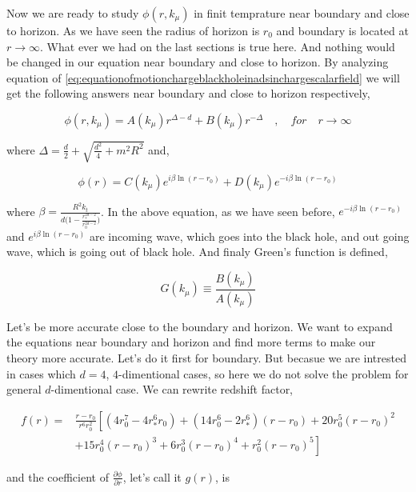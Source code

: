 Now we are ready to study $\phi(r,k_\mu)$ in finit temprature near boundary and close to horizon. As we have seen the radius of horizon is $r_0$ and boundary is located at $r \rightarrow \infty$. What ever we had on the last sections is true here. And nothing would be changed in our equation near boundary and close to horizon. By analyzing equation of \ref{eq:equationofmotionchargeblackholeinadsinchargescalarfield} we will get the following answers near boundary and close to horizon respectively,

\begin{equation}
    \phi(r,k_\mu) = A(k_\mu)r^{\Delta-d} + B(k_\mu)r^{-\Delta} \quad , \quad for \quad r \rightarrow \infty
\end{equation}

where $\Delta = \frac{d}{2} + \sqrt{\frac{d^2}{4} + m^2R^2}$ and,

\begin{equation}
    \phi(r) = C(k_\mu)e^{ i\beta \ln{(r-r_0)}} + D(k_\mu)e^{- i\beta\ln{(r-r_0)}} 
\end{equation}

where $\beta = \frac{R^2k_t}{d\big(1-\frac{r^{2d-2}_*}{r^{2d-2}_0}\big)}$. In the above equation, as we have seen before, $e^{-i\beta \ln{(r-r_0)}}$ and $e^{i\beta \ln{(r-r_0)}}$ are incoming wave, which goes into the black hole, and out going wave, which is going out of black hole. And finaly Green's function is defined,

\begin{equation}
   G(k_\mu) \equiv \frac{B(k_\mu)}{A(k_\mu)}  
\end{equation} 

Let's be more accurate close to the boundary and horizon. We want to expand the equations near boundary and horizon and find more terms to make our theory more accurate. Let's do it first for boundary. But becasue we are intrested in cases which $d =4$, $4$-dimentional cases, so here we do not solve the problem for general $d$-dimentional case. We can rewrite redshift factor, 

\begin{align}
    f(r) =& \frac{r-r_0}{r^6r_0^2} \left[ (4r_0^7-4r_*^6r_0) + (14r_0^6-2r_*^6)(r-r_0) + 20r_0^5(r-r_0)^2 \right. \nonumber\\
          &  \left. + 15r_0^4(r-r_0)^3 + 6r_0^3(r-r_0)^4 + r_0^2(r-r_0)^5 \right]
\end{align}

and the coefficient of $\frac{\partial\phi}{\partial r}$, let's call it $g(r)$, is

